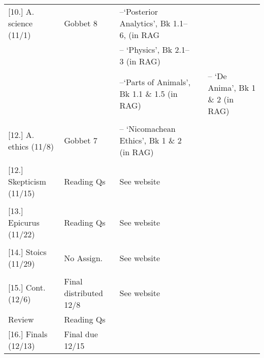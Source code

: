 \documentclass[article,oneside]{memoir}
\begin{document}
\begin{center}
\begin{longtable}{p{4.5cm}p{2cm}p{4.5cm}}

[10.] A. science  (11/1)			& Gobbet 8               &  --`Posterior Analytics', Bk 1.1--6, (in RAG \\ 
							&				& -- `Physics',  Bk 2.1--3 (in RAG) \\
			    				& 				& --`Parts of Animals', Bk 1.1 \& 1.5 (in RAG) 
							&				& -- `De Anima', Bk 1 \& 2 (in RAG) \\ \\ [1.8\baselineskip] \hline


[12.] A. ethics	(11/8)			& Gobbet 7		& -- `Nicomachean Ethics', Bk 1 \& 2 (in RAG) \\
							&				& 	 \\ [1.8\baselineskip] \hline


[12.] Skepticism (11/15)			& Reading Qs		& See website  \\
							&				& 	 \\ [1.8\baselineskip] \hline                        %

[13.] Epicurus  (11/22)			& Reading Qs		&  	See website		\\ 
					    		& 				& 					\\ [1.8\baselineskip] \hline

												 
[14.] Stoics (11/29)				& No Assign. 				&  See website \\ 
							& 			 			& \\  [1.8\baselineskip] \hline

[15.] Cont. (12/6)				& Final distributed 12/8		&  See website \\ 
	Review					& Reading Qs				 & \\  [1.8\baselineskip] \hline


[16.] Finals (12/13)				& Final due 12/15			& \\ [1.8\baselineskip] \hline
	

\end{longtable}
\end{center}
\end{document}
